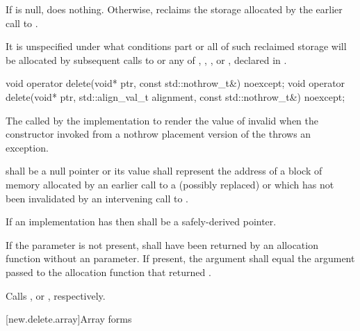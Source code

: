 \begin{itemdescr}
\pnum
{}
If  is null, does nothing. Otherwise, reclaims the
storage allocated by the earlier call to .

\pnum
\remarks
It is unspecified under what conditions part or all of such
%
reclaimed storage will be allocated by subsequent
calls to
or any of
,
,
,
or
,
declared in
.
\end{itemdescr}

%
\begin{itemdecl}
void operator delete(void* ptr, const std::nothrow_t&) noexcept;
void operator delete(void* ptr, std::align_val_t alignment, const std::nothrow_t&) noexcept;
\end{itemdecl}

\begin{itemdescr}
\pnum
\effects
The
called by the implementation
to render the value of  invalid
when the constructor invoked from a nothrow
placement version of the  throws an exception.

\pnum
\replaceable
{}

\pnum
\requires
{} shall be a null pointer or
its value shall represent the address of
a block of memory allocated by
an earlier call to a (possibly replaced)
or
which has not been invalidated by an intervening call to
.

\pnum
\requires
If an implementation has 
then  shall be a safely-derived pointer.

\pnum
\requires
If the  parameter is not present,
 shall have been returned by an allocation function
without an  parameter.
If present, the  argument
shall equal the  argument
passed to the allocation function that returned .

\pnum
{}
Calls ,
or ,
respectively.
\end{itemdescr}

[new.delete.array]{Array forms}

